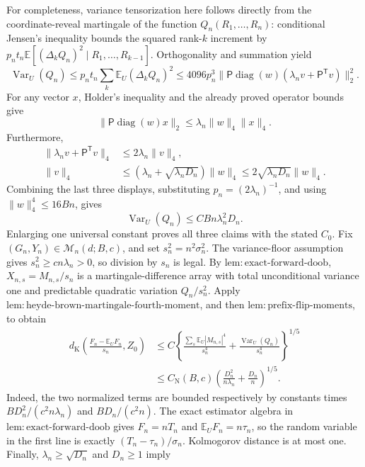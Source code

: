 For completeness, variance tensorization here follows directly from the coordinate-reveal martingale of the function \(Q_n(R_1,\ldots,R_n)\): conditional Jensen's inequality bounds the squared rank-\(k\) increment by \(p_nt_n\mathbb E[(\Delta_kQ_n)^2\mid R_1,\ldots,R_{k-1}]\).  Orthogonality and summation yield
\[
 \operatorname{Var}_U(Q_n)\le p_nt_n\sum_k\mathbb E_U(\Delta_kQ_n)^2
 \le4096p_n^3\|\mathsf P\operatorname{diag}(w)
 (\lambda_nv+\mathsf P^{\mathsf T}v)\|_2^2.
\]
For any vector \(x\), Holder's inequality and the already proved operator bounds give
\[
 \|\mathsf P\operatorname{diag}(w)x\|_2
 \le\lambda_n\|w\|_4\|x\|_4.
\]
Furthermore,
\[
 \begin{aligned}
 \|\lambda_nv+\mathsf P^{\mathsf T}v\|_4&\le2\lambda_n\|v\|_4,\\
 \|v\|_4&\le(\lambda_n+\sqrt{\lambda_nD_n})\|w\|_4
 \le2\sqrt{\lambda_nD_n}\|w\|_4.
 \end{aligned}
\]
Combining the last three displays, substituting \(p_n=(2\lambda_n)^{-1}\), and using \(\|w\|_4^4\le16Bn\), gives
\[
 \operatorname{Var}_U(Q_n)\le C Bn\lambda_n^2D_n.
\]
Enlarging one universal constant proves all three claims with the stated \(C_0\).
Fix \((G_n,Y_n)\in\mathcal M_n(d;B,c)\), and set \(s_n^2=n^2\sigma_n^2\).  The variance-floor assumption gives \(s_n^2\ge cn\lambda_n>0\), so division by \(s_n\) is legal.  By \(\mathrm{lem:exact\text{-}forward\text{-}doob}\), \(X_{n,s}=M_{n,s}/s_n\) is a martingale-difference array with total unconditional variance one and predictable quadratic variation \(Q_n/s_n^2\).  Apply \(\mathrm{lem:heyde\text{-}brown\text{-}martingale\text{-}fourth\text{-}moment}\), and then \(\mathrm{lem:prefix\text{-}flip\text{-}moments}\), to obtain
\[
 \begin{aligned}
 d_{\mathrm K}\left(\frac{F_n-\mathbb E_UF_n}{s_n},Z_0\right)
 &\le C\left\{
 \frac{\sum_s\mathbb E_U|M_{n,s}|^4}{s_n^4}
 +\frac{\operatorname{Var}_U(Q_n)}{s_n^4}\right\}^{1/5}\\
 &\le C_{\mathrm N}(B,c)
 \left(\frac{D_n^2}{n\lambda_n}+\frac{D_n}{n}\right)^{1/5}.
 \end{aligned}
\]
Indeed, the two normalized terms are bounded respectively by constants times \(BD_n^2/(c^2n\lambda_n)\) and \(BD_n/(c^2n)\).  The exact estimator algebra in \(\mathrm{lem:exact\text{-}forward\text{-}doob}\) gives \(F_n=nT_n\) and \(\mathbb E_UF_n=n\tau_n\), so the random variable in the first line is exactly \((T_n-\tau_n)/\sigma_n\).  Kolmogorov distance is at most one.  Finally, \(\lambda_n\ge\sqrt{D_n}\) and \(D_n\ge1\) imply
